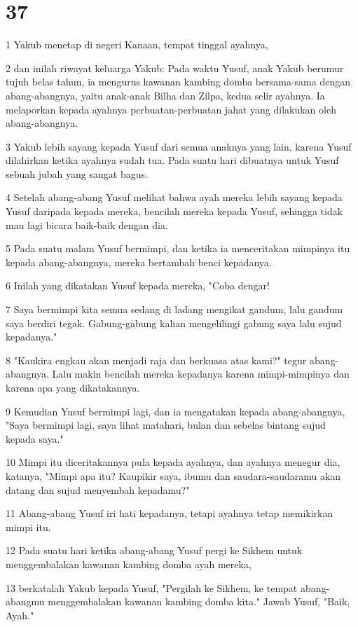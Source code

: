 \chapter{37}

\par 1 Yakub menetap di negeri Kanaan, tempat tinggal ayahnya,
\par 2 dan inilah riwayat keluarga Yakub: Pada waktu Yusuf, anak Yakub berumur tujuh belas tahun, ia mengurus kawanan kambing domba bersama-sama dengan abang-abangnya, yaitu anak-anak Bilha dan Zilpa, kedua selir ayahnya. Ia melaporkan kepada ayahnya perbuatan-perbuatan jahat yang dilakukan oleh abang-abangnya.
\par 3 Yakub lebih sayang kepada Yusuf dari semua anaknya yang lain, karena Yusuf dilahirkan ketika ayahnya sudah tua. Pada suatu hari dibuatnya untuk Yusuf sebuah jubah yang sangat bagus.
\par 4 Setelah abang-abang Yusuf melihat bahwa ayah mereka lebih sayang kepada Yusuf daripada kepada mereka, bencilah mereka kepada Yusuf, sehingga tidak mau lagi bicara baik-baik dengan dia.
\par 5 Pada suatu malam Yusuf bermimpi, dan ketika ia menceritakan mimpinya itu kepada abang-abangnya, mereka bertambah benci kepadanya.
\par 6 Inilah yang dikatakan Yusuf kepada mereka, "Coba dengar!
\par 7 Saya bermimpi kita semua sedang di ladang mengikat gandum, lalu gandum saya berdiri tegak. Gabung-gabung kalian mengelilingi gabung saya lalu sujud kepadanya."
\par 8 "Kaukira engkau akan menjadi raja dan berkuasa atas kami?" tegur abang-abangnya. Lalu makin bencilah mereka kepadanya karena mimpi-mimpinya dan karena apa yang dikatakannya.
\par 9 Kemudian Yusuf bermimpi lagi, dan ia mengatakan kepada abang-abangnya, "Saya bermimpi lagi, saya lihat matahari, bulan dan sebelas bintang sujud kepada saya."
\par 10 Mimpi itu diceritakannya pula kepada ayahnya, dan ayahnya menegur dia, katanya, "Mimpi apa itu? Kaupikir saya, ibumu dan saudara-saudaramu akan datang dan sujud menyembah kepadamu?"
\par 11 Abang-abang Yusuf iri hati kepadanya, tetapi ayahnya tetap memikirkan mimpi itu.
\par 12 Pada suatu hari ketika abang-abang Yusuf pergi ke Sikhem untuk menggembalakan kawanan kambing domba ayah mereka,
\par 13 berkatalah Yakub kepada Yusuf, "Pergilah ke Sikhem, ke tempat abang-abangmu menggembalakan kawanan kambing domba kita." Jawab Yusuf, "Baik, Ayah."
